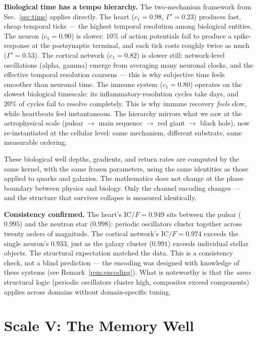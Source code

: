 \documentclass[
  aps,
  prd,
  twocolumn,
  superscriptaddress,
  nofootinbib,
  floatfix
]{revtex4-2}
\newcommand{\Gam}{\Gamma}
\newcommand{\IC}{\mathrm{IC}}
\begin{document}
\textbf{Biological time has a tempo hierarchy.}
The two-mechanism framework from Sec.~\ref{sec:time} applies
directly.  The heart ($c_1 = 0.98$, $\Gam' = 0.23$)
produces fast, cheap temporal ticks --- the highest
temporal resolution among biological entities.  The neuron ($c_1 =
0.90$) is slower: $10\%$ of action potentials fail
to produce a spike-response at the postsynaptic terminal,
and each tick costs roughly twice as much ($\Gam' = 0.53$).
The cortical network ($c_1 = 0.82$) is slower still:
network-level oscillations (alpha, gamma) emerge from
averaging many neuronal clocks, and the effective temporal
resolution coarsens --- this is why subjective time feels
smoother than neuronal time.  The immune system ($c_1 =
0.80$) operates on the slowest biological timescale: its
inflammatory-resolution cycles take days, and $20\%$ of
cycles fail to resolve completely.  This is why immune
recovery \emph{feels} slow, while heartbeats feel
instantaneous.  The hierarchy mirrors what we saw at the
astrophysical scale (pulsar $\to$ main sequence $\to$ red
giant $\to$ black hole), now re-instantiated at the
cellular level: same mechanism, different substrate, same
measurable ordering.

These biological well depths, gradients, and return rates
are computed by the same kernel, with the same frozen
parameters, using the same identities as those applied to
quarks and galaxies.  The mathematics does not change at the
phase boundary between physics and biology.  Only the channel
encoding changes --- and the structure that survives collapse
is measured identically.

\textbf{Consistency confirmed.}
The heart's $\IC/F = 0.949$ sits between the pulsar
($0.995$) and the neutron star ($0.998$): periodic
oscillators cluster together across twenty orders of
magnitude.  The cortical network's $\IC/F = 0.974$ exceeds
the single neuron's $0.933$, just as the galaxy cluster
($0.991$) exceeds individual stellar objects.  The structural
expectation matched the data.  This is a consistency
check, not a blind prediction --- the encoding was
designed with knowledge of these systems (see
Remark~\ref{rem:encoding}).  What is noteworthy is that
the \emph{same} structural logic (periodic oscillators
cluster high, composites exceed components) applies
across domains without domain-specific tuning.


\section{Scale V: The Memory Well}\label{sec:memory}
\end{document}

